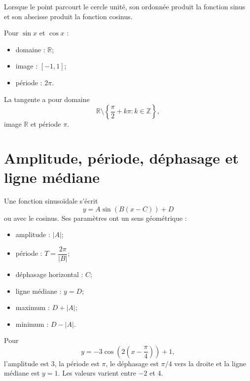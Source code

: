 \documentclass[12pt,a4paper,openany]{book}
\newcommand{\R}{\mathbb{R}}
\newcommand{\Z}{\mathbb{Z}}
\newcommand{\abs}[1]{\left\lvert #1\right\rvert}
\begin{document}
Lorsque le point parcourt le cercle unité, son ordonnée produit la fonction sinus et son abscisse produit la fonction cosinus.

\begin{center}
\end{center}

Pour $\sin x$ et $\cos x$ :
\begin{itemize}
\item domaine : $\R$;
\item image : $[-1,1]$;
\item période : $2\pi$.
\end{itemize}
La tangente a pour domaine
\[
\R\setminus\left\{\frac\pi2+k\pi:k\in\Z\right\},
\]
image $\R$ et période $\pi$.

\section{Amplitude, période, déphasage et ligne médiane}

Une fonction sinusoïdale s'écrit
\[
y=A\sin(B(x-C))+D
\]
ou avec le cosinus. Ses paramètres ont un sens géométrique :
\begin{itemize}
\item amplitude : $\abs A$;
\item période : $T=\dfrac{2\pi}{\abs B}$;
\item déphasage horizontal : $C$;
\item ligne médiane : $y=D$;
\item maximum : $D+\abs A$;
\item minimum : $D-\abs A$.
\end{itemize}

\begin{examplebox}
Pour
\[
y=-3\cos\left(2\left(x-\frac\pi4\right)\right)+1,
\]
l'amplitude est $3$, la période est $\pi$, le déphasage est $\pi/4$ vers la droite et la ligne médiane est $y=1$. Les valeurs varient entre $-2$ et $4$.
\end{examplebox}
\end{document}

